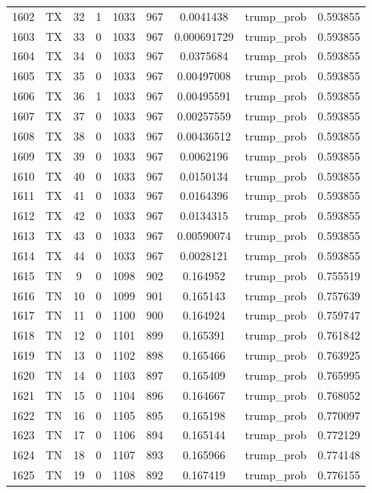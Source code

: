 \documentclass[12pt,a4paper]{article}
\begin{document}
\begin{tabular}{r|cccccccc}
	1602 & TX & 32 & 1 & 1033 & 967 & 0.0041438 & trump\_prob & 0.593855 \\
	1603 & TX & 33 & 0 & 1033 & 967 & 0.000691729 & trump\_prob & 0.593855 \\
	1604 & TX & 34 & 0 & 1033 & 967 & 0.0375684 & trump\_prob & 0.593855 \\
	1605 & TX & 35 & 0 & 1033 & 967 & 0.00497008 & trump\_prob & 0.593855 \\
	1606 & TX & 36 & 1 & 1033 & 967 & 0.00495591 & trump\_prob & 0.593855 \\
	1607 & TX & 37 & 0 & 1033 & 967 & 0.00257559 & trump\_prob & 0.593855 \\
	1608 & TX & 38 & 0 & 1033 & 967 & 0.00436512 & trump\_prob & 0.593855 \\
	1609 & TX & 39 & 0 & 1033 & 967 & 0.0062196 & trump\_prob & 0.593855 \\
	1610 & TX & 40 & 0 & 1033 & 967 & 0.0150134 & trump\_prob & 0.593855 \\
	1611 & TX & 41 & 0 & 1033 & 967 & 0.0164396 & trump\_prob & 0.593855 \\
	1612 & TX & 42 & 0 & 1033 & 967 & 0.0134315 & trump\_prob & 0.593855 \\
	1613 & TX & 43 & 0 & 1033 & 967 & 0.00590074 & trump\_prob & 0.593855 \\
	1614 & TX & 44 & 0 & 1033 & 967 & 0.0028121 & trump\_prob & 0.593855 \\
	1615 & TN & 9 & 0 & 1098 & 902 & 0.164952 & trump\_prob & 0.755519 \\
	1616 & TN & 10 & 0 & 1099 & 901 & 0.165143 & trump\_prob & 0.757639 \\
	1617 & TN & 11 & 0 & 1100 & 900 & 0.164924 & trump\_prob & 0.759747 \\
	1618 & TN & 12 & 0 & 1101 & 899 & 0.165391 & trump\_prob & 0.761842 \\
	1619 & TN & 13 & 0 & 1102 & 898 & 0.165466 & trump\_prob & 0.763925 \\
	1620 & TN & 14 & 0 & 1103 & 897 & 0.165409 & trump\_prob & 0.765995 \\
	1621 & TN & 15 & 0 & 1104 & 896 & 0.164667 & trump\_prob & 0.768052 \\
	1622 & TN & 16 & 0 & 1105 & 895 & 0.165198 & trump\_prob & 0.770097 \\
	1623 & TN & 17 & 0 & 1106 & 894 & 0.165144 & trump\_prob & 0.772129 \\
	1624 & TN & 18 & 0 & 1107 & 893 & 0.165966 & trump\_prob & 0.774148 \\
	1625 & TN & 19 & 0 & 1108 & 892 & 0.167419 & trump\_prob & 0.776155 \\

\end{tabular}
\end{document}
